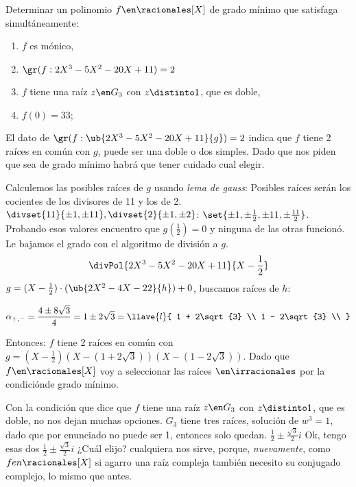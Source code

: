 \begin{enunciado}{\ejExtra}
        Determinar un polinomio $f \en \racionales[X]$ de grado mínimo que satisfaga 
        simultáneamente:\par

\begin{enumerate}[label=$\scriptscriptstyle\blacksquare$]
	\item $f$ es mónico,
    \item $\gr(f:2X^3-5X^2-20X +11) = 2$
    \item $f$ tiene una raíz $z \en G_3$ con $z \distinto 1$, que es doble,
	\item $f(0) = 33$;
\end{enumerate}
\end{enunciado}

El dato de
    $\gr(f:\ub{2X^3-5X^2-20X +11}{g}) = 2$ indica que $f$ tiene 2 raíces en común con $g$, 
    puede ser una doble o dos simples. Dado que nos piden que sea de grado mínimo
    habrá que tener cuidado cual elegir.\par
    Calculemos las posibles raíces de $g$ usando \textit{lema de gauss}:
    Posibles raíces serán los cocientes de los divisores de 11 y los de 2.
    $\divset{11}{\pm1,\pm11}, \divset{2}{\pm1,\pm2}$:
    $\set{\pm 1,\pm\frac{1}{2},\pm 11, \pm\frac{11}{2}}$.
    Probando esos valores encuentro que $g(\frac{1}{2}) = 0$ y ninguna de las
    otras funcionó. Le bajamos el grado con el algoritmo de división a $g$.
$$
    \divPol{2X^3 - 5X^2 - 20X + 11}{X - \frac{1}{2}}
$$
    $g = (X-\frac{1}{2})\cdot(\ub{2X^2 - 4X -22}{h}) + 0 $, buscamos raíces de $h$:\par

    $$\alpha_{+,-} =
    \frac{4 \pm 8\sqrt{3}}{4} =
    1 \pm 2\sqrt{3} =
    \llave{l}{
            1 + 2\sqrt{3} \\
            1 - 2\sqrt{3} \\
    }
    $$

    Entonces: 
    $f$ tiene 2 raíces en común con 
    $g = (X - \frac{1}{2})(X - (1+2\sqrt{3})) (X - (1-2\sqrt{3})) $. Dado que 
    $f \en \racionales[X]$  voy a seleccionar las raíces $ \en \irracionales$ por
    la condiciónde grado mínimo.\bigskip

    Con la condición que dice que $f$ tiene una raíz $z \en G_3$ con $z \distinto 1$,
    que es doble, no nos dejan muchas opciones. $G_3$ tiene tres raíces, solución
    de $w^3 = 1$, dado que por enunciado no puede ser 1, entonces solo quedan.
    $\frac{1}{2} \pm \frac{\sqrt{3}}{2}i$ 
    Ok, tengo esas dos $\frac{1}{2} \pm \frac{\sqrt{3}}{2}i$ ¿Cuál elijo? cualquiera nos
    sirve, porque, \textit{nuevamente}, como $f en \racionales[X]$ si agarro una raíz compleja
    también necesito su conjugado complejo, lo mismo que antes.\par

